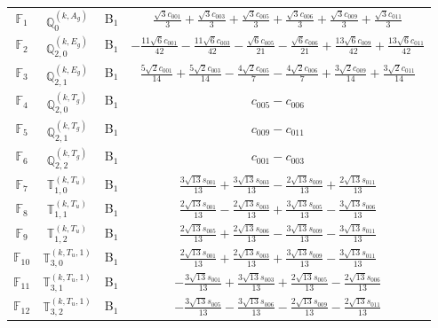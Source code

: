 \documentclass[fleqn,10pt,landscape]{article}
\begin{document}
\begin{itemize}
\begin{center}
\begin{longtable}{c|c|c|c}
$ \mathbb{F}_{1} $ & $\mathbb{Q}_{0}^{(k,A_{g})}$ & B$_{1}$ & $\frac{\sqrt{3} c_{001}}{3} + \frac{\sqrt{3} c_{003}}{3} + \frac{\sqrt{3} c_{005}}{3} + \frac{\sqrt{3} c_{006}}{3} + \frac{\sqrt{3} c_{009}}{3} + \frac{\sqrt{3} c_{011}}{3}$ \\
$ \mathbb{F}_{2} $ & $\mathbb{Q}_{2,0}^{(k,E_{g})}$ & B$_{1}$ & $- \frac{11 \sqrt{6} c_{001}}{42} - \frac{11 \sqrt{6} c_{003}}{42} - \frac{\sqrt{6} c_{005}}{21} - \frac{\sqrt{6} c_{006}}{21} + \frac{13 \sqrt{6} c_{009}}{42} + \frac{13 \sqrt{6} c_{011}}{42}$ \\
$ \mathbb{F}_{3} $ & $\mathbb{Q}_{2,1}^{(k,E_{g})}$ & B$_{1}$ & $\frac{5 \sqrt{2} c_{001}}{14} + \frac{5 \sqrt{2} c_{003}}{14} - \frac{4 \sqrt{2} c_{005}}{7} - \frac{4 \sqrt{2} c_{006}}{7} + \frac{3 \sqrt{2} c_{009}}{14} + \frac{3 \sqrt{2} c_{011}}{14}$ \\
$ \mathbb{F}_{4} $ & $\mathbb{Q}_{2,0}^{(k,T_{g})}$ & B$_{1}$ & $c_{005} - c_{006}$ \\
$ \mathbb{F}_{5} $ & $\mathbb{Q}_{2,1}^{(k,T_{g})}$ & B$_{1}$ & $c_{009} - c_{011}$ \\
$ \mathbb{F}_{6} $ & $\mathbb{Q}_{2,2}^{(k,T_{g})}$ & B$_{1}$ & $c_{001} - c_{003}$ \\
$ \mathbb{F}_{7} $ & $\mathbb{T}_{1,0}^{(k,T_{u})}$ & B$_{1}$ & $\frac{3 \sqrt{13} s_{001}}{13} + \frac{3 \sqrt{13} s_{003}}{13} - \frac{2 \sqrt{13} s_{009}}{13} + \frac{2 \sqrt{13} s_{011}}{13}$ \\
$ \mathbb{F}_{8} $ & $\mathbb{T}_{1,1}^{(k,T_{u})}$ & B$_{1}$ & $\frac{2 \sqrt{13} s_{001}}{13} - \frac{2 \sqrt{13} s_{003}}{13} + \frac{3 \sqrt{13} s_{005}}{13} - \frac{3 \sqrt{13} s_{006}}{13}$ \\
$ \mathbb{F}_{9} $ & $\mathbb{T}_{1,2}^{(k,T_{u})}$ & B$_{1}$ & $\frac{2 \sqrt{13} s_{005}}{13} + \frac{2 \sqrt{13} s_{006}}{13} - \frac{3 \sqrt{13} s_{009}}{13} - \frac{3 \sqrt{13} s_{011}}{13}$ \\
$ \mathbb{F}_{10} $ & $\mathbb{T}_{3,0}^{(k,T_{u},1)}$ & B$_{1}$ & $\frac{2 \sqrt{13} s_{001}}{13} + \frac{2 \sqrt{13} s_{003}}{13} + \frac{3 \sqrt{13} s_{009}}{13} - \frac{3 \sqrt{13} s_{011}}{13}$ \\
$ \mathbb{F}_{11} $ & $\mathbb{T}_{3,1}^{(k,T_{u},1)}$ & B$_{1}$ & $- \frac{3 \sqrt{13} s_{001}}{13} + \frac{3 \sqrt{13} s_{003}}{13} + \frac{2 \sqrt{13} s_{005}}{13} - \frac{2 \sqrt{13} s_{006}}{13}$ \\
$ \mathbb{F}_{12} $ & $\mathbb{T}_{3,2}^{(k,T_{u},1)}$ & B$_{1}$ & $- \frac{3 \sqrt{13} s_{005}}{13} - \frac{3 \sqrt{13} s_{006}}{13} - \frac{2 \sqrt{13} s_{009}}{13} - \frac{2 \sqrt{13} s_{011}}{13}$ \\ \hline

\end{longtable}
\end{center}
\end{itemize}
\end{document}

